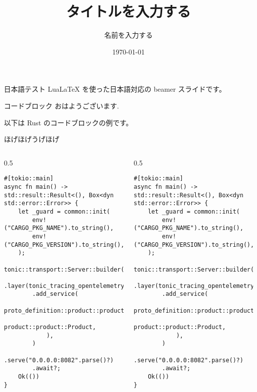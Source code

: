 \documentclass[aspectratio=169]{beamer}
\title{タイトルを入力する}
\author{名前を入力する}
\institute{所属を入力する}
\date{\today}   %
\begin{document}
\frame{\titlepage}

\begin{frame}{日本語テスト}
    LuaLaTeX を使った日本語対応の beamer スライドです。
\end{frame}

\begin{frame}[fragile]{コードブロック}
    おはようございます. \par
    以下は Rust のコードブロックの例です。\par
    ほげほげうげほげ\par

    \lstset{basicstyle=\tiny}

    \begin{columns}
        \begin{column}{0.5\linewidth}
            \begin{lstlisting}
#[tokio::main]
async fn main() -> std::result::Result<(), Box<dyn std::error::Error>> {
    let _guard = common::init(
        env!("CARGO_PKG_NAME").to_string(),
        env!("CARGO_PKG_VERSION").to_string(),
    );
    tonic::transport::Server::builder()
        .layer(tonic_tracing_opentelemetry::middleware::server::OtelGrpcLayer::default())
        .add_service(
            proto_definition::product::product_service_server::ProductServiceServer::new(
                product::product::Product,
            ),
        )
        .serve("0.0.0.0:8082".parse()?)
        .await?;
    Ok(())
}

\end{lstlisting}
        \end{column}
        \begin{column}{0.5\linewidth}
            \begin{lstlisting}
#[tokio::main]
async fn main() -> std::result::Result<(), Box<dyn std::error::Error>> {
    let _guard = common::init(
        env!("CARGO_PKG_NAME").to_string(),
        env!("CARGO_PKG_VERSION").to_string(),
    );
    tonic::transport::Server::builder()
        .layer(tonic_tracing_opentelemetry::middleware::server::OtelGrpcLayer::default())
        .add_service(
            proto_definition::product::product_service_server::ProductServiceServer::new(
                product::product::Product,
            ),
        )
        .serve("0.0.0.0:8082".parse()?)
        .await?;
    Ok(())
}

            \end{lstlisting}
        \end{column}
    \end{columns}

\end{frame}
\end{document}
